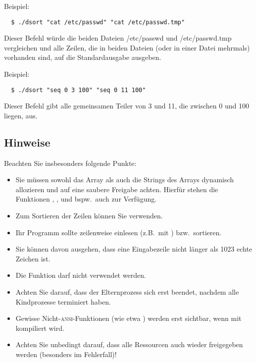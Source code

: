Beispiel:
\begin{verbatim}
  $ ./dsort "cat /etc/passwd" "cat /etc/passwd.tmp"
\end{verbatim}

Dieser Befehl würde die beiden Dateien /etc/passwd und /etc/passwd.tmp
vergleichen und alle Zeilen, die in beiden Dateien (oder in einer Datei
mehrmals) vorhanden sind, auf die Standardausgabe ausgeben.

Beispiel:
\begin{verbatim}
  $ ./dsort "seq 0 3 100" "seq 0 11 100"
\end{verbatim}

Dieser Befehl gibt alle gemeinsamen Teiler von 3 und 11, die zwischen
0 und 100 liegen, aus.

\subsection*{Hinweise}

Beachten Sie insbesonders folgende Punkte:

\begin{itemize}
\item Sie müssen sowohl das Array als auch die Strings des Arrays
dynamisch allozieren und auf eine saubere Freigabe achten. Hierfür
stehen die Funktionen , ,
 und bspw.\ auch  zur Verfügung.
\item Zum Sortieren der Zeilen können Sie  verwenden.
\item Ihr Programm sollte zeilenweise einlesen (z.B.\ mit
) bzw.\ sortieren.
\item Sie können davon ausgehen, dass eine Eingabezeile nicht länger
als 1023 echte Zeichen ist.
\item Die Funktion  darf nicht verwendet werden.
\item Achten Sie darauf, dass der Elternprozess sich erst beendet,
nachdem alle Kindprozesse terminiert haben.
\item Gewisse Nicht-\textsc{ansi}-Funktionen (wie etwa )
werden erst sichtbar, wenn mit\\ kompiliert wird.
\item Achten Sie unbedingt darauf, dass alle Ressourcen auch wieder
freigegeben werden (besonders im Fehlerfall)!
\end{itemize}

\osueguidelinestwo


